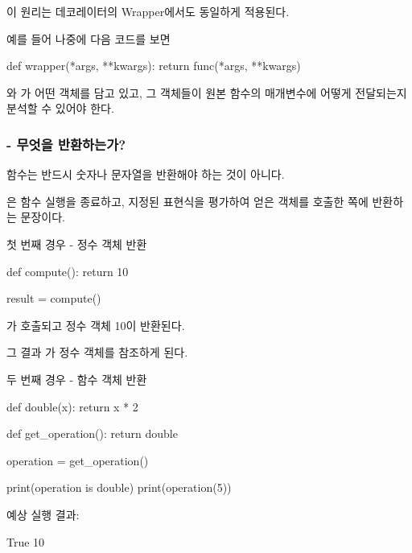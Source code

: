이 원리는 데코레이터의 Wrapper에서도 동일하게 적용된다.

예를 들어 나중에 다음 코드를 보면

\begin{dhkcode}
def wrapper(*args, **kwargs):
    return func(*args, **kwargs)
\end{dhkcode}

와 가 어떤 객체를 담고 있고, 그 객체들이 원본 함수의 매개변수에 어떻게 전달되는지 분석할 수 있어야 한다.

\subsubsection{ - 무엇을 반환하는가?}

함수는 반드시 숫자나 문자열을 반환해야 하는 것이 아니다.

은 함수 실행을 종료하고, 지정된 표현식을 평가하여 얻은 객체를 호출한 쪽에 반환하는 문장이다.

\begin{dhknote}
\begin{dhksmry}[centered]
첫 번째 경우 - 정수 객체 반환
\end{dhksmry}
\end{dhknote}

\begin{dhkcode}
def compute():
    return 10

result = compute()
\end{dhkcode}

가 호출되고 정수 객체 10이 반환된다.

그 결과 가 정수 객체를 참조하게 된다.

\begin{dhknote}
\begin{dhksmry}[centered]
두 번째 경우 - 함수 객체 반환
\end{dhksmry}
\end{dhknote}

\begin{dhkcode}
def double(x):
    return x * 2

def get_operation():
    return double

operation = get_operation()

print(operation is double)
print(operation(5))
\end{dhkcode}

예상 실행 결과:

\begin{dhkzsh}
True
10
\end{dhkzsh}


